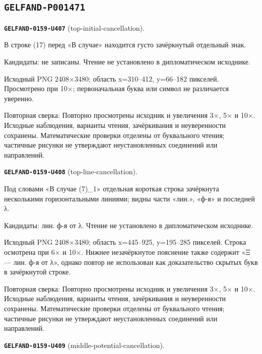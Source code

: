 \subsection*{\texttt{GELFAND-P001471}}
\par\noindent\leavevmode{}\label{GELFAND-0159-U407}\label{GELFAND-P001471:top-initial-cancellation}\textbf{\texttt{GELFAND-0159-U407}} (top-initial-cancellation).\nopagebreak[4]\par
В строке (17) перед «В случае» находится густо зачёркнутый отдельный знак.\par
Кандидаты: не записаны. Чтение не установлено в дипломатическом исходнике.\par
Исходный PNG 2408×3480; область x=310–412, y=66–182 пикселей. Просмотрено при 10×; первоначальная буква или символ не различается уверенно.\par
Повторная сверка: Повторно просмотрены исходник и увеличения 3×, 5× и 10×. Исходные наблюдения, варианты чтения, зачёркивания и неуверенности сохранены. Математические проверки отделены от буквального чтения; частичные рисунки не утверждают неустановленных соединений или направлений.\par\medskip
\par\noindent\leavevmode{}\label{GELFAND-0159-U408}\label{GELFAND-P001471:top-line-cancellation}\textbf{\texttt{GELFAND-0159-U408}} (top-line-cancellation).\nopagebreak[4]\par
Под словами «В случае (7)\_1» отдельная короткая строка зачёркнута несколькими горизонтальными линиями; видны части «лин.», «ф-я» и последней λ.\par
Кандидаты: лин. ф-я от λ. Чтение не установлено в дипломатическом исходнике.\par
Исходный PNG 2408×3480; область x=445–925, y=195–285 пикселей. Строка осмотрена при 6× и 10×. Нижнее незачёркнутое пояснение также содержит «Ξ — лин. ф-я от λ», однако повтор не использован как доказательство скрытых букв в зачёркнутой строке.\par
Повторная сверка: Повторно просмотрены исходник и увеличения 3×, 5× и 10×. Исходные наблюдения, варианты чтения, зачёркивания и неуверенности сохранены. Математические проверки отделены от буквального чтения; частичные рисунки не утверждают неустановленных соединений или направлений.\par\medskip
\par\noindent\leavevmode{}\label{GELFAND-0159-U409}\label{GELFAND-P001471:middle-potential-cancellation}\textbf{\texttt{GELFAND-0159-U409}} (middle-potential-cancellation).\nopagebreak[4]\par
